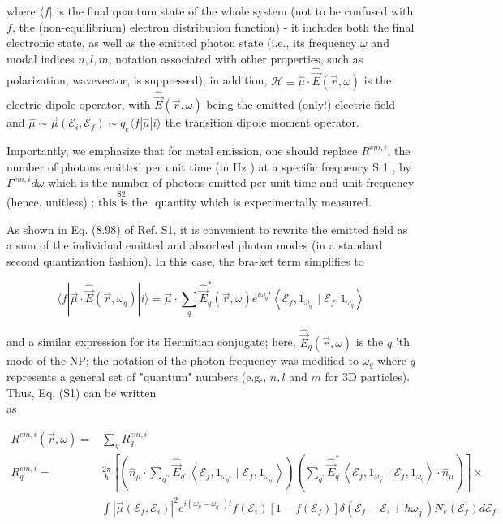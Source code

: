 \documentclass[10pt]{article}
\begin{document}
where $\langle f|$ is the final quantum state of the whole system (not to be confused with $f$, the (non-equilibrium) electron distribution function) - it includes both the final electronic state, as well as the emitted photon state (i.e., its frequency $\omega$ and modal indices $n, l, m$; notation associated with other properties, such as polarization, wavevector, is suppressed); in addition, $\mathcal{H} \equiv \hat{\mu} \cdot \hat{\vec{E}}(\vec{r}, \omega)$ is the electric dipole operator, with $\hat{\vec{E}}(\vec{r}, \omega)$ being the emitted (only!) electric field and $\hat{\mu} \sim \vec{\mu}\left(\mathcal{E}_{i}, \mathcal{E}_{f}\right) \sim q_{e}\langle f| \hat{\mu}|i\rangle$ the transition dipole moment operator.

Importantly, we emphasize that for metal emission, one should replace $R^{e m, i}$, the number of photons emitted per unit time (in Hz ) at a specific frequency S 1 , by $\Gamma^{e m, i} d \omega$ which is the number of photons emitted per unit time and unit frequency (hence, unitless) $\stackrel{\mathrm{S} 2}{\text {; this is the }}$ quantity which is experimentally measured.

As shown in Eq. (8.98) of Ref. S1, it is convenient to rewrite the emitted field as a sum of the individual emitted and absorbed photon modes (in a standard second quantization fashion). In this case, the bra-ket term simplifies to


\begin{equation*}
\langle f| \vec{\mu} \cdot \hat{\vec{E}}\left(\vec{r}, \omega_{q}\right)|i\rangle=\vec{\mu} \cdot \sum_{q} \hat{\vec{E}}_{q}^{*}(\vec{r}, \omega) e^{i \omega_{q} t}\left\langle\mathcal{E}_{f}, 1_{\omega_{q^{\prime}}} \mid \mathcal{E}_{f}, 1_{\omega_{q}}\right\rangle \tag{S2}
\end{equation*}


and a similar expression for its Hermitian conjugate; here, $\hat{\vec{E}}_{q}(\vec{r}, \omega)$ is the $q$ 'th mode of the NP; the notation of the photon frequency was modified to $\omega_{q}$ where $q$ represents a general set of "quantum" numbers (e.g., $n, l$ and $m$ for 3D particles). Thus, Eq. (S1) can be written\\
as

$$
\begin{aligned}
R^{e m, i}(\vec{r}, \omega)= & \sum_{q} R_{q}^{e m, i} \\
R_{q}^{e m, i}= & \frac{2 \pi}{\hbar}\left[\left(\hat{n}_{\mu} \cdot \sum_{q^{\prime \prime}} \hat{\vec{E}}_{q^{\prime \prime}}\left\langle\mathcal{E}_{f}, 1_{\omega_{q^{\prime \prime}}} \mid \mathcal{E}_{f}, 1_{\omega_{q^{\prime}}}\right\rangle\right)\left(\sum_{q^{\prime}} \hat{\vec{E}}_{q^{\prime}}^{*}\left\langle\mathcal{E}_{f}, 1_{\omega_{q^{\prime}}} \mid \mathcal{E}_{f}, 1_{\omega_{q}}\right\rangle \cdot \hat{n}_{\mu}\right)\right] \times \\
& \int\left|\vec{\mu}\left(\mathcal{E}_{f}, \mathcal{E}_{i}\right)\right|^{2} e^{i\left(\omega_{q}-\omega_{q^{\prime \prime}}\right) t} f\left(\mathcal{E}_{i}\right)\left[1-f\left(\mathcal{E}_{f}\right)\right] \delta\left(\mathcal{E}_{f}-\mathcal{E}_{i}+\hbar \omega_{q^{\prime}}\right) N_{e}\left(\mathcal{E}_{f}\right) d \mathcal{E}_{f}
\end{aligned}
$$
\end{document}
